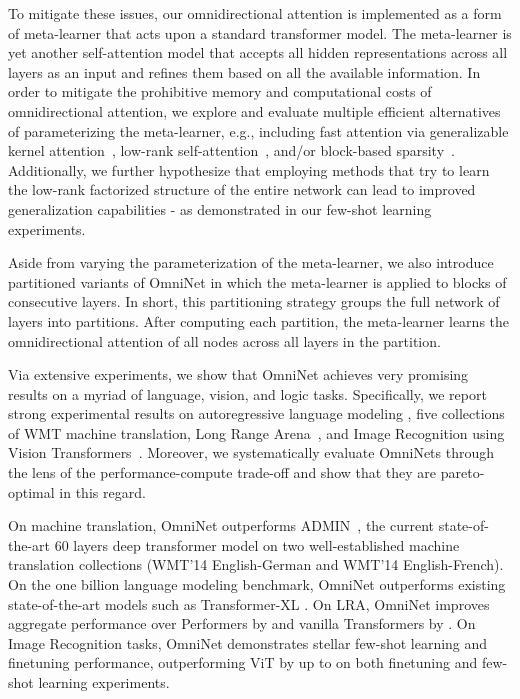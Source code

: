 \documentclass{article}
\begin{document}
To mitigate these issues, our omnidirectional attention is implemented as a form of meta-learner that acts upon a standard transformer model. The meta-learner is yet another self-attention model that accepts all hidden representations across all layers as an input and refines them based on all the available information. In order to mitigate the prohibitive memory and computational costs of omnidirectional attention, we explore and evaluate multiple efficient alternatives of parameterizing the meta-learner, e.g., including fast attention via generalizable kernel attention~\citep{choromanski2020rethinking}, low-rank self-attention~\citep{wang2020linformer}, and/or block-based sparsity~\citep{zaheer2020big}.  Additionally, we further hypothesize that employing methods that try to learn the low-rank factorized structure of the entire network can lead to improved generalization capabilities - as demonstrated in our few-shot learning experiments.

Aside from varying the parameterization of the meta-learner, we also introduce partitioned variants of OmniNet in which the meta-learner is applied to blocks of  consecutive layers. In short, this partitioning strategy groups the full network of  layers into  partitions. After computing each partition, the meta-learner learns the omnidirectional attention of all nodes across all layers in the partition.  

Via extensive experiments, we show that OmniNet achieves very promising results on a myriad of language, vision, and logic tasks. Specifically, we report strong experimental results on autoregressive language modeling \citep{chelba2013one,raffel2019exploring}, five collections of WMT machine translation, Long Range Arena~\citep{tay2020long}, and Image Recognition using Vision Transformers~\citep{dosovitskiy2020image}. Moreover, we systematically evaluate OmniNets through the lens of the performance-compute trade-off and show that they are pareto-optimal in this regard.

On machine translation, OmniNet outperforms ADMIN~\citep{liu2020very}, the current state-of-the-art 60 layers deep transformer model on two well-established machine translation collections (WMT'14 English-German and WMT'14 English-French). On the one billion language modeling benchmark, OmniNet outperforms existing state-of-the-art models such as Transformer-XL \citep{dai2019transformer}. On LRA, OmniNet improves aggregate performance over Performers \citep{choromanski2020rethinking} by  and vanilla Transformers by . On Image Recognition tasks, OmniNet demonstrates stellar few-shot learning and finetuning performance, outperforming ViT \citep{dosovitskiy2020image} by up to  on both finetuning and few-shot learning experiments.
\end{document}
